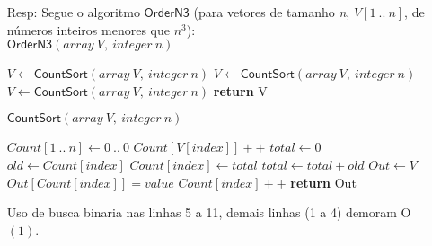 \documentclass{homework}
\begin{document}
	\begin{enumerate}
		\item[Resp:] Segue o algoritmo $\mathsf{OrderN3}$ (para vetores de tamanho \textit{n}, $V[1\ ..\ n]$, de números inteiros menores que $n^3$):\\
			$\mathsf{OrderN3}(array\ V,\ integer\ n)$
			\begin{algorithmic}[1]
			    \State $V \gets \mathsf{CountSort}(array\ V,\ integer\ n)$
			    \State $V \gets \mathsf{CountSort}(array\ V,\ integer\ n)$
			    \State $V \gets \mathsf{CountSort}(array\ V,\ integer\ n)$
				\State \textbf{return} V
			\end{algorithmic}
			$\mathsf{CountSort}(array\ V,\ integer\ n)$
			\begin{algorithmic}[1]
			    \State $Count[1\ ..\ n] \gets {0\ ..\ 0}$
			        \State $Count[V[index]]++$
			    \EndFor
			    \State $total \gets 0$
			        \State $old \gets Count[index]$
			        \State $Count[index] \gets total$
			        \State $total \gets total + old$
			    \EndFor
			    \State $Out \gets V$
			        \State $Out[Count[index]] = value$
			        \State $Count[index]++$
			    \EndFor
				\State \textbf{return} Out
			\end{algorithmic}
            Uso de busca binaria nas linhas 5 a 11, demais linhas (1 a 4) demoram O$(1)$.
    \end{enumerate}
\end{document}
